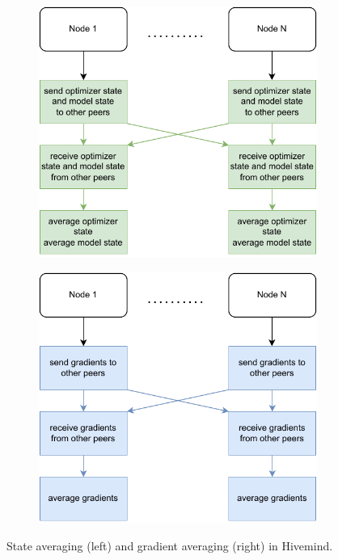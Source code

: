 \begin{figure}[ht]
    \centering
    \begin{subfigure}[b]{0.475 \textwidth}
        \centering
        \caption{}
        \label{fig:state-averaging}
        \includegraphics[width=\textwidth]{./figures/02_optimizer_averaging.pdf}
    \end{subfigure}%
    \hfill
    \begin{subfigure}[b]{0.475 \textwidth}
        \centering
        \caption{}
        \label{fig:gradient-averaging}
        \includegraphics[width=\textwidth]{./figures/02_gradient_averaging.pdf}
    \end{subfigure}
    \caption{State averaging (left) and gradient averaging (right) in Hivemind.}
\end{figure}

